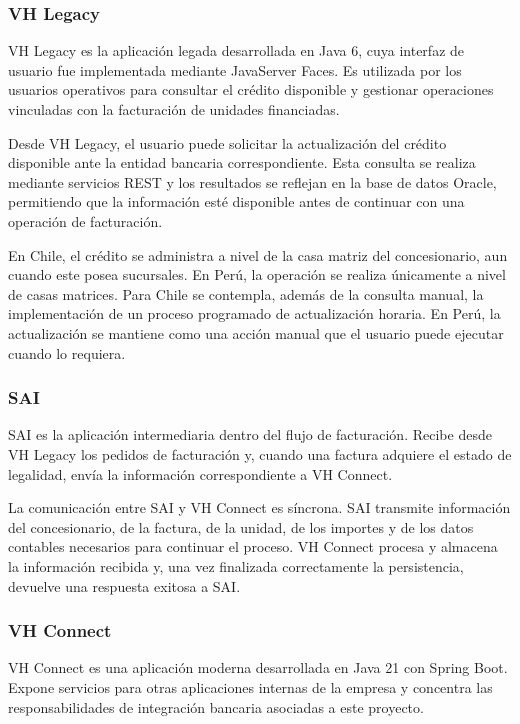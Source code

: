 \subsubsection{VH Legacy}

VH Legacy es la aplicación legada desarrollada en Java 6, cuya interfaz de usuario fue implementada mediante JavaServer Faces. Es utilizada por los usuarios operativos para consultar el crédito disponible y gestionar operaciones vinculadas con la facturación de unidades financiadas.

Desde VH Legacy, el usuario puede solicitar la actualización del crédito disponible ante la entidad bancaria correspondiente. Esta consulta se realiza mediante servicios REST y los resultados se reflejan en la base de datos Oracle, permitiendo que la información esté disponible antes de continuar con una operación de facturación.

En Chile, el crédito se administra a nivel de la casa matriz del concesionario, aun cuando este posea sucursales. En Perú, la operación se realiza únicamente a nivel de casas matrices. Para Chile se contempla, además de la consulta manual, la implementación de un proceso programado de actualización horaria. En Perú, la actualización se mantiene como una acción manual que el usuario puede ejecutar cuando lo requiera.

\subsubsection{SAI}

SAI es la aplicación intermediaria dentro del flujo de facturación. Recibe desde VH Legacy los pedidos de facturación y, cuando una factura adquiere el estado de legalidad, envía la información correspondiente a VH Connect.

La comunicación entre SAI y VH Connect es síncrona. SAI transmite información del concesionario, de la factura, de la unidad, de los importes y de los datos contables necesarios para continuar el proceso. VH Connect procesa y almacena la información recibida y, una vez finalizada correctamente la persistencia, devuelve una respuesta exitosa a SAI.

\subsubsection{VH Connect}

VH Connect es una aplicación moderna desarrollada en Java 21 con Spring Boot. Expone servicios para otras aplicaciones internas de la empresa y concentra las responsabilidades de integración bancaria asociadas a este proyecto.


